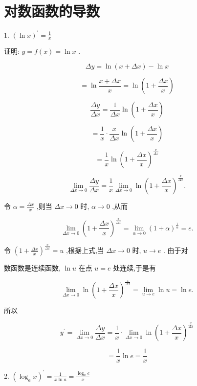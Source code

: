 \documentclass[lang=cn,newtx,12pt,scheme=chinese]{elegantbook}
\begin{document}
\section{对数函数的导数}

1. \({\left( \ln x\right) }^{\prime } = \frac{1}{x}\)

证明: \(y = f\left( x\right) = \ln x\) .

\[
{\Delta y} = \ln \left( {x + {\Delta x}}\right) - \ln x
\]

\[
= \ln \frac{x + {\Delta x}}{x} = \ln \left( {1 + \frac{\Delta x}{x}}\right)
\]

\[
\frac{\Delta y}{\Delta x} = \frac{1}{\Delta x}\ln \left( {1 + \frac{\Delta x}{x}}\right)
\]

\[
= \frac{1}{x} \cdot \frac{x}{\Delta x}\ln \left( {1 + \frac{\Delta x}{x}}\right)
\]

\[
= \frac{1}{x}\ln {\left( 1 + \frac{\Delta x}{x}\right) }^{\frac{x}{\Delta x}}
\]

\[
\mathop{\lim }\limits_{{{\Delta x} \rightarrow 0}}\frac{\Delta y}{\Delta x} = \frac{1}{x}\mathop{\lim }\limits_{{{\Delta x} \rightarrow 0}}\ln {\left( 1 + \frac{\Delta x}{x}\right) }^{\frac{x}{\Delta x}}.
\]

令 \(\alpha = \frac{\Delta x}{x}\) ,则当 \({\Delta x} \rightarrow 0\) 时, \(\alpha \rightarrow 0\) ,从而

\[
\mathop{\lim }\limits_{{{\Delta x} \rightarrow 0}}{\left( 1 + \frac{\Delta x}{x}\right) }^{\frac{x}{\Delta x}} = \mathop{\lim }\limits_{{\alpha \rightarrow 0}}{\left( 1 + \alpha \right) }^{\frac{1}{\alpha }} = e.
\]

令 \({\left( 1 + \frac{\Delta x}{x}\right) }^{\frac{x}{\Delta x}} = u\) ,根据上式,当 \({\Delta x} \rightarrow 0\) 时, \(u \rightarrow e\) . 由于对

数函数是连续函数, \(\ln u\) 在点 \(u = e\) 处连续,于是有

\[
\mathop{\lim }\limits_{{{\Delta x} \rightarrow 0}}\ln {\left( 1 + \frac{\Delta x}{x}\right) }^{\frac{x}{\Delta x}} = \mathop{\lim }\limits_{{u \rightarrow e}}\ln u = \ln e.
\]

所以

\[
{y}^{\prime } = \mathop{\lim }\limits_{{{\Delta x} \rightarrow 0}}\frac{\Delta y}{\Delta x} = \frac{1}{x} \cdot \mathop{\lim }\limits_{{{\Delta x} \rightarrow 0}}\ln {\left( 1 + \frac{\Delta x}{x}\right) }^{\frac{x}{\Delta x}}
\]

\[
= \frac{1}{x}\ln e = \frac{1}{x}
\]

2. \({\left( {\log }_{a}x\right) }^{\prime } = \frac{1}{x\ln a} = \frac{{\log }_{a}e}{x}\)
\end{document}
